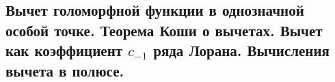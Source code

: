 \subsection{Вычет голоморфной функции в однозначной особой точке. Теорема Коши о вычетах. Вычет как коэффициент $c_{-1}$ ряда Лорана. Вычисления вычета в полюсе.}